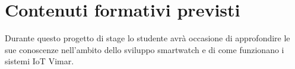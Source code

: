 \section*{Contenuti formativi previsti}
Durante questo progetto di stage lo studente avrà occasione di approfondire le sue conoscenze nell'ambito dello sviluppo smartwatch e di come funzionano i sistemi IoT Vimar.
\newpage